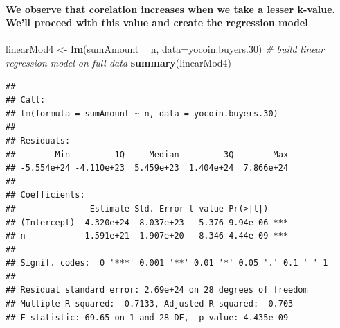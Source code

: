 \documentclass[]{article}
\newenvironment{Shaded}{\begin{snugshade}}{\end{snugshade}}
\newcommand{\KeywordTok}[1]{\textcolor[rgb]{0.13,0.29,0.53}{\textbf{#1}}}
\newcommand{\DataTypeTok}[1]{\textcolor[rgb]{0.13,0.29,0.53}{#1}}
\newcommand{\DecValTok}[1]{\textcolor[rgb]{0.00,0.00,0.81}{#1}}
\newcommand{\StringTok}[1]{\textcolor[rgb]{0.31,0.60,0.02}{#1}}
\newcommand{\CommentTok}[1]{\textcolor[rgb]{0.56,0.35,0.01}{\textit{#1}}}
\newcommand{\OperatorTok}[1]{\textcolor[rgb]{0.81,0.36,0.00}{\textbf{#1}}}
\newcommand{\NormalTok}[1]{#1}
\let\oldparagraph\paragraph
\renewcommand{\paragraph}[1]{\oldparagraph{#1}\mbox{}}
\begin{document}
\paragraph{We observe that corelation increases when we take a lesser
k-value. We'll proceed with this value and create the regression
model}\label{we-observe-that-corelation-increases-when-we-take-a-lesser-k-value.-well-proceed-with-this-value-and-create-the-regression-model}

\begin{Shaded}
\begin{Highlighting}[]
\NormalTok{linearMod4 <-}\StringTok{ }\KeywordTok{lm}\NormalTok{(sumAmount }\OperatorTok{~}\StringTok{ }\NormalTok{n, }\DataTypeTok{data=}\NormalTok{yocoin.buyers.}\DecValTok{30}\NormalTok{)  }\CommentTok{# build linear regression model on full data}
\KeywordTok{summary}\NormalTok{(linearMod4)}
\end{Highlighting}
\end{Shaded}

\begin{verbatim}
## 
## Call:
## lm(formula = sumAmount ~ n, data = yocoin.buyers.30)
## 
## Residuals:
##        Min         1Q     Median         3Q        Max 
## -5.554e+24 -4.110e+23  5.459e+23  1.404e+24  7.866e+24 
## 
## Coefficients:
##               Estimate Std. Error t value Pr(>|t|)    
## (Intercept) -4.320e+24  8.037e+23  -5.376 9.94e-06 ***
## n            1.591e+21  1.907e+20   8.346 4.44e-09 ***
## ---
## Signif. codes:  0 '***' 0.001 '**' 0.01 '*' 0.05 '.' 0.1 ' ' 1
## 
## Residual standard error: 2.69e+24 on 28 degrees of freedom
## Multiple R-squared:  0.7133, Adjusted R-squared:  0.703 
## F-statistic: 69.65 on 1 and 28 DF,  p-value: 4.435e-09
\end{verbatim}
\end{document}
